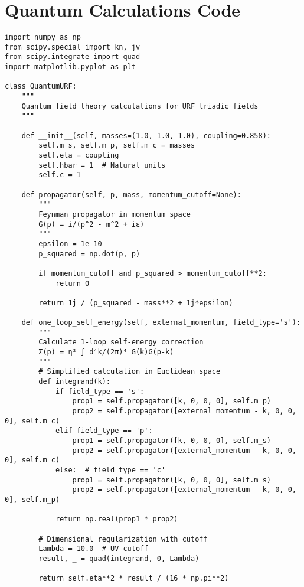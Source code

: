 \documentclass[openany]{memoir}
\theoremstyle{definition}
\theoremstyle{plain}
\theoremstyle{remark}
\begin{document}
\chapter{Quantum Calculations Code}

\lstset{language=Python}
\begin{lstlisting}
import numpy as np
from scipy.special import kn, jv
from scipy.integrate import quad
import matplotlib.pyplot as plt

class QuantumURF:
    """
    Quantum field theory calculations for URF triadic fields
    """
    
    def __init__(self, masses=(1.0, 1.0, 1.0), coupling=0.858):
        self.m_s, self.m_p, self.m_c = masses
        self.eta = coupling
        self.hbar = 1  # Natural units
        self.c = 1
        
    def propagator(self, p, mass, momentum_cutoff=None):
        """
        Feynman propagator in momentum space
        G(p) = i/(p^2 - m^2 + iε)
        """
        epsilon = 1e-10
        p_squared = np.dot(p, p)
        
        if momentum_cutoff and p_squared > momentum_cutoff**2:
            return 0
            
        return 1j / (p_squared - mass**2 + 1j*epsilon)
    
    def one_loop_self_energy(self, external_momentum, field_type='s'):
        """
        Calculate 1-loop self-energy correction
        Σ(p) = η² ∫ d⁴k/(2π)⁴ G(k)G(p-k)
        """
        # Simplified calculation in Euclidean space
        def integrand(k):
            if field_type == 's':
                prop1 = self.propagator([k, 0, 0, 0], self.m_p)
                prop2 = self.propagator([external_momentum - k, 0, 0, 0], self.m_c)
            elif field_type == 'p':
                prop1 = self.propagator([k, 0, 0, 0], self.m_s)
                prop2 = self.propagator([external_momentum - k, 0, 0, 0], self.m_c)
            else:  # field_type == 'c'
                prop1 = self.propagator([k, 0, 0, 0], self.m_s)
                prop2 = self.propagator([external_momentum - k, 0, 0, 0], self.m_p)
                
            return np.real(prop1 * prop2)
        
        # Dimensional regularization with cutoff
        Lambda = 10.0  # UV cutoff
        result, _ = quad(integrand, 0, Lambda)
        
        return self.eta**2 * result / (16 * np.pi**2)
    

\end{lstlisting}
\end{document}
